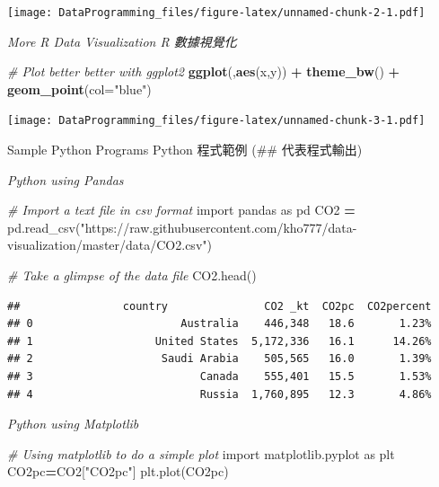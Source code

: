 \documentclass[]{book}
\newenvironment{Shaded}{\begin{snugshade}}{\end{snugshade}}
\newcommand{\CommentTok}[1]{\textcolor[rgb]{0.56,0.35,0.01}{\textit{#1}}}
\newcommand{\DataTypeTok}[1]{\textcolor[rgb]{0.13,0.29,0.53}{#1}}
\newcommand{\ImportTok}[1]{#1}
\newcommand{\KeywordTok}[1]{\textcolor[rgb]{0.13,0.29,0.53}{\textbf{#1}}}
\newcommand{\NormalTok}[1]{#1}
\newcommand{\OperatorTok}[1]{\textcolor[rgb]{0.81,0.36,0.00}{\textbf{#1}}}
\newcommand{\StringTok}[1]{\textcolor[rgb]{0.31,0.60,0.02}{#1}}
\begin{document}
\texttt{[image: DataProgramming\_files/figure-latex/unnamed-chunk-2-1.pdf]}

\emph{More R Data Visualization R 數據視覺化}

\begin{Shaded}
\begin{Highlighting}[]
\CommentTok{# Plot better better with ggplot2}
\KeywordTok{ggplot}\NormalTok{(,}\KeywordTok{aes}\NormalTok{(x,y)) }\OperatorTok{+}\StringTok{ }\KeywordTok{theme_bw}\NormalTok{() }\OperatorTok{+}\StringTok{ }\KeywordTok{geom_point}\NormalTok{(}\DataTypeTok{col=}\StringTok{"blue"}\NormalTok{)}
\end{Highlighting}
\end{Shaded}

\texttt{[image: DataProgramming\_files/figure-latex/unnamed-chunk-3-1.pdf]}

Sample Python Programs Python 程式範例 (\#\# 代表程式輸出)

\emph{Python using Pandas}

\begin{Shaded}
\begin{Highlighting}[]

\CommentTok{# Import a text file in csv format}
\ImportTok{import}\NormalTok{ pandas }\ImportTok{as}\NormalTok{ pd}
\NormalTok{CO2 }\OperatorTok{=}\NormalTok{ pd.read_csv(}\StringTok{"https://raw.githubusercontent.com/kho777/data-visualization/master/data/CO2.csv"}\NormalTok{)}

\CommentTok{# Take a glimpse of the data file}
\NormalTok{CO2.head()}
\end{Highlighting}
\end{Shaded}

\begin{verbatim}
##                country               CO2 _kt  CO2pc  CO2percent
## 0                       Australia    446,348   18.6       1.23%
## 1                   United States  5,172,336   16.1      14.26%
## 2                    Saudi Arabia    505,565   16.0       1.39%
## 3                          Canada    555,401   15.5       1.53%
## 4                          Russia  1,760,895   12.3       4.86%
\end{verbatim}

\emph{Python using Matplotlib}

\begin{Shaded}
\begin{Highlighting}[]
\CommentTok{# Using matplotlib to do a simple plot}
\ImportTok{import}\NormalTok{ matplotlib.pyplot }\ImportTok{as}\NormalTok{ plt}
\NormalTok{CO2pc}\OperatorTok{=}\NormalTok{CO2[}\StringTok{"CO2pc"}\NormalTok{]}
\NormalTok{plt.plot(CO2pc)}
\end{Highlighting}
\end{Shaded}
\end{document}
